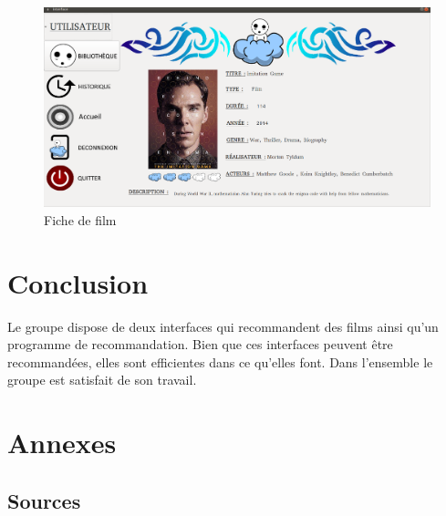 \documentclass{article}
\begin{document}
\begin{figure}[H]
    \centering
    \includegraphics[scale=0.3]{Images/interface4.png}
    \caption{\label{4} Fiche de film}
\end{figure}

\section{Conclusion}

Le groupe dispose de deux interfaces qui recommandent des films ainsi qu'un programme de recommandation. Bien que ces interfaces peuvent être recommandées, elles sont efficientes dans ce qu'elles font. Dans l'ensemble le groupe est satisfait de son travail.

\section*{Annexes}

\subsection*{Sources}



\end{document}
